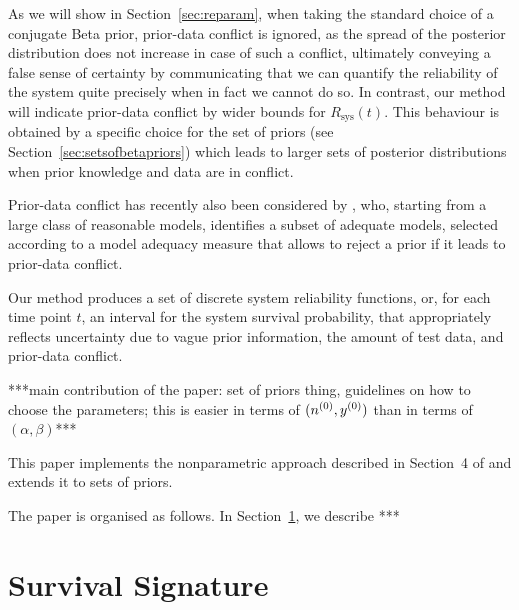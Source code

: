 \documentclass[12pt, a4paper]{elsarticle}
\newcommand{\Rsys}{R_\text{sys}}
\begin{document}
As we will show in Section~\ref{sec:reparam}, when taking the standard choice of a conjugate Beta prior,
prior-data conflict is ignored, as the spread of the posterior distribution does not increase in case of such a conflict,
ultimately conveying a false sense of certainty
by communicating that we can quantify the reliability of the system quite precisely when in fact we cannot do so.
In contrast, our method will indicate prior-data conflict by wider bounds for $\Rsys(t)$.
This behaviour is obtained by a specific choice for the set of priors (see Section~\ref{sec:setsofbetapriors})
which leads to larger sets of posterior distributions when prior knowledge and data are in conflict.

Prior-data conflict has recently also been considered by \citet{2015:bickel},
who, starting from a large class of reasonable models,
identifies a subset of adequate models,
selected according to a model adequacy measure that allows to reject a prior if it leads to prior-data conflict.

Our method produces a set of discrete system reliability functions,
or, for each time point $t$, an interval for the system survival probability,
that appropriately reflects uncertainty due to vague prior information, the amount of test data, and prior-data conflict.

***main contribution of the paper:
set of priors thing,
guidelines on how to choose the parameters;
this is easier in terms of $(n^{(0)}, y^{(0)})$ than in terms of $(\alpha, \beta)$***

This paper implements the nonparametric approach described in Section~4 of \citet{2015:bayessurvsign}
and extends it to sets of priors.

The paper is organised as follows.
In Section~\ref{sec:survsign}, we describe ***
\fi

\section{Survival Signature}
\label{sec:survsign}
\end{document}
